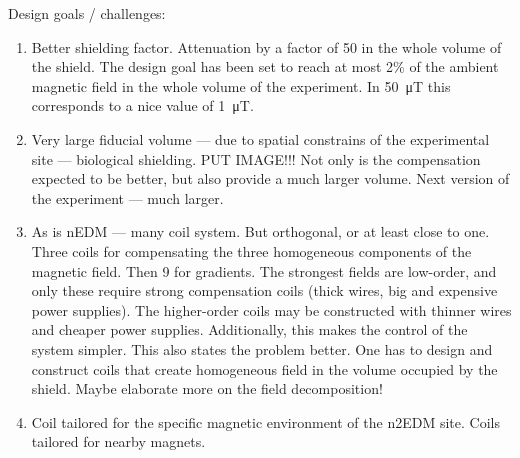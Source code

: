 Design goals / challenges:
\begin{enumerate}
  \item Better shielding factor. Attenuation by a factor of 50 in the whole volume of the shield. The design goal has been set to reach at most 2\% of the ambient magnetic field in the
  whole volume of the experiment. In \SI{50}{\micro\tesla} this corresponds to a nice value of \SI{1}{\micro\tesla}.
  \item Very large fiducial volume --- due to spatial constrains of the experimental site --- biological shielding. PUT IMAGE!!! Not only is the compensation expected to be better, but also provide a much larger volume. Next version of the experiment --- much larger.
  \item As is nEDM --- many coil system. But orthogonal, or at least close to one. Three coils for compensating the three homogeneous components of the magnetic field. Then 9 for gradients. The strongest fields are low-order, and only these require strong compensation coils (thick wires, big and expensive power supplies). The higher-order coils may be constructed with thinner wires and cheaper power supplies.
  Additionally, this makes the control of the system simpler.
  This also states the problem better. One has to design and construct coils that create homogeneous field in the volume occupied by the shield. Maybe elaborate more on the field decomposition!
  \item Coil tailored for the specific magnetic environment of the n2EDM site. Coils tailored for nearby magnets.
\end{enumerate}
